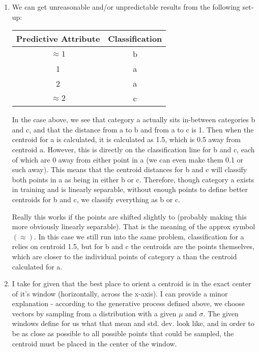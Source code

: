 \documentclass{article}
\begin{document}
\begin{enumerate}
\begin{enumerate}
			\item We can get unreasonable and/or unpredictable results from the following set-up:
			
			\begin{center}
				\begin{tabular}{|c|c|}
					\hline
					Predictive Attribute & Classification \\
					\hline
					$\approx 1$ & b\\
					\hline
					1 & a \\
					\hline
					2 & a \\
					\hline
					$\approx 2$ & c \\
					\hline
				\end{tabular}
			\end{center}
			
			In the case above, we see that category a actually sits in-between categories b and c, and that the distance from a to b and from a to c is 1.  Then when the centroid for a is calculated, it is calculated as 1.5, which is 0.5 away from centroid a.  However, this is directly on the classification line for b and c, each of which are 0 away from either point in a (we can even make them 0.1 or such away).  This means that the centroid distances for b and c will classify both points in a as being in either b or c.  Therefore, though category a exists in training and is linearly separable, without enough points to define better centroids for b and c, we classify everything as b or c.
			
			Really this works if the points are shifted slightly to (probably making this more obviously linearly separable).  That is the meaning of the approx symbol $(\approx)$.  In this case we still run into the same problem, classification for a relies on centroid 1.5, but for b and c the centroids are the points themselves, which are closer to the individual points of category a than the centroid calculated for a.
			
			\item I take for given that the best place to orient a centroid is in the exact center of it's window (horizontally, across the x-axis).  I can provide a minor explanation - according to the generative process defined above, we choose vectors by sampling from a distribution with a given $\mu$ and $\sigma$.  The given windows define for us what that mean and std. dev. look like, and in order to be as close as possible to all possible points that could be sampled, the centroid must be placed in the center of the window.
			

\end{enumerate}
\end{enumerate}
\end{document}
